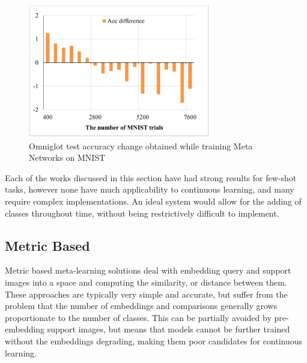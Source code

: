 \documentclass{report}
\begin{document}
\begin{figure}[h]
 \centering
 \includegraphics[width=8cm]{metanet2}
 \caption{Omniglot test accuracy change obtained while training Meta Networks on MNIST}
 \label{fig:metanet:2}
\end{figure}
Each of the works discussed in this section have had strong results for few-shot tasks, however none have much applicability to continuous learning, and many require complex implementations. An ideal system would allow for the adding of classes throughout time, without being restrictively difficult to implement. \par

\subsection{Metric Based} \label{related-meta-metr:1}
Metric based meta-learning solutions deal with embedding query and support images into a space and computing the similarity, or distance between them. These approaches are typically very simple and accurate, but suffer from the problem that the number of embeddings and comparisons generally grows proportionate to the number of classes. This can be partially avoided by pre-embedding support images, but means that models cannot be further trained without the embeddings degrading, making them poor candidates for continuous learning. \par
\end{document}
